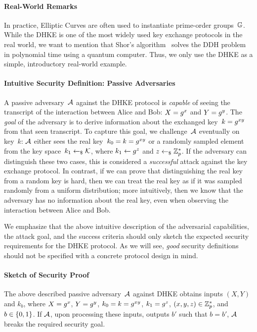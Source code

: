 \paragraph{Real-World Remarks}
In practice, Elliptic Curves are often used to instantiate prime-order groups~$\mathbb{G}$.
While the DHKE is one of the most widely used key exchange protocols in the real world, we want to mention that Shor's algorithm~\cite{FOCS:Shor94} solves the DDH problem in polynomial time using a quantum computer.
Thus, we only use the DHKE as a simple, introductory real-world example.

\paragraph{Intuitive Security Definition: Passive Adversaries}
A passive adversary~$\mathcal{A}$ against the DHKE protocol is \emph{capable} of seeing the transcript of the interaction between Alice and Bob: $X=g^x$ and $Y=g^y$.
The \emph{goal} of the adversary is to derive information about the exchanged key~$k=g^{xy}$ from that seen transcript.
To capture this goal, we challenge~$\mathcal{A}$ eventually on key~$k$:
$\mathcal{A}$ either sees the real key~$k_0=k=g^{xy}$ or a randomly sampled element from the key space~$k_1\gets_\$\mathcal{K}$, where $k_1\gets g^z$ and $z\gets_\$\mathbb{Z}_p^*$.
If the adversary can distinguish these two cases, this is considered a \emph{successful} attack against the key exchange protocol.
In contrast, if we can prove that distinguishing the real key from a random key is hard, then we can treat the real key as if it was sampled randomly from a uniform distribution;
more intuitively, then we know that the adversary has no information about the real key, even when observing the interaction between Alice and Bob.

We emphasize that the above intuitive description of the adversarial capabilities, the attack goal, and the success criteria should only sketch the expected security requirements for the DHKE protocol.
As we will see, \emph{good} security definitions should not be specified with a concrete protocol design in mind.

\paragraph{Sketch of Security Proof}
The above described passive adversary~$\mathcal{A}$ against DHKE obtains inputs $(X,Y)$ and $k_b$, where $X=g^x$, $Y=g^y$, $k_0=k=g^{xy}$, $k_1=g^z$, $(x,y,z)\in\mathbb{Z}_p^*$, and $b\in\{0,1\}$.
If $\mathcal{A}$, upon processing these inputs, outputs $b'$ such that $b=b'$, $\mathcal{A}$ breaks the required security goal.

